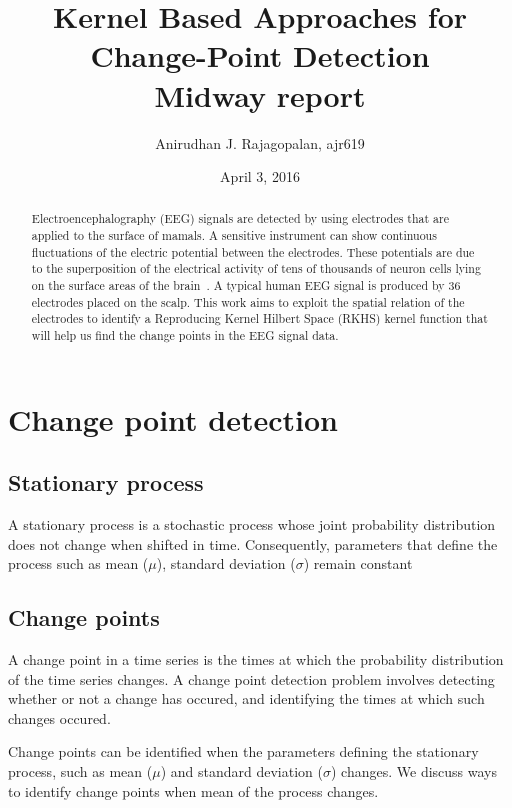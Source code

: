 \documentclass{article}
\begin{document}
\title{Kernel Based Approaches for Change-Point Detection\\ Midway report}
\date{April 3, 2016}
\author{Anirudhan J. Rajagopalan, ajr619}

\maketitle

\newpage

\begin{abstract}
  Electroencephalography (EEG) signals are detected by using electrodes that are applied to the surface of mamals.  A sensitive instrument can show continuous fluctuations of the electric potential between the electrodes.  These potentials are due to the superposition of the electrical activity of tens of thousands of neuron cells lying on the surface areas of the brain~\cite{npsdpm}.  A typical human EEG signal is produced by 36 electrodes placed on the scalp.  This work aims to exploit the spatial relation of the electrodes to identify a Reproducing Kernel Hilbert Space (RKHS) kernel function that will help us find the change points in the EEG signal data.
\end{abstract}


\section{Change point detection}
\subsection{Stationary process}
A stationary process is a stochastic process whose joint probability distribution does not change when shifted in time.  Consequently, parameters that define the process such as mean ($\mu$), standard deviation ($\sigma$) remain constant

\subsection{Change points}
A change point in a time series is the times at which the probability distribution of the time series changes.  A change point detection problem involves detecting whether or not a change has occured, and identifying the times at which such changes occured.

Change points can be identified when the parameters defining the stationary process, such as mean ($\mu$) and standard deviation ($\sigma$) changes.  We discuss ways to identify change points when mean of the process changes.
\end{document}
